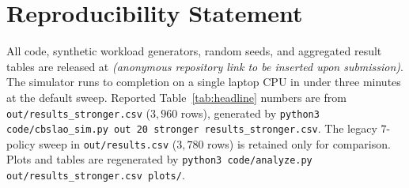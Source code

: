 \section*{Reproducibility Statement}
\label{sec:repro}

All code, synthetic workload generators, random seeds, and aggregated
result tables are released at \emph{(anonymous repository link to be
inserted upon submission)}. The simulator runs to completion on a
single laptop CPU in under three minutes at the default sweep.
Reported Table~\ref{tab:headline} numbers are from
\texttt{out/results\_stronger.csv} ($3{,}960$ rows), generated by
\texttt{python3 code/cbslao\_sim.py out 20 stronger results\_stronger.csv}.
The legacy $7$-policy sweep in \texttt{out/results.csv} ($3{,}780$
rows) is retained only for comparison. Plots and tables are
regenerated by
\texttt{python3 code/analyze.py out/results\_stronger.csv plots/}.
